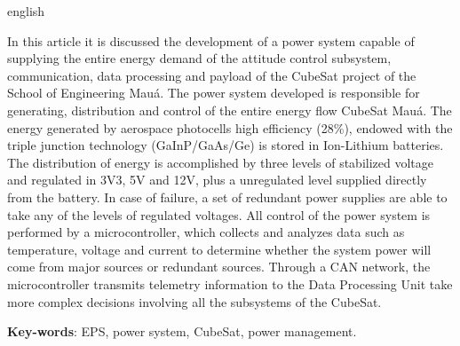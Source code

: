 \documentclass[
	12pt,				%
	openright,			%
	oneside,			%
	a4paper,			%
	english,			%
	french,				%
	spanish,			%
	brazil,				%
	oldfontcommands
	]{abntex2}
\begin{document}
\begin{resumo}[Abstract]
 \begin{otherlanguage*}{english}
 
	In this article it is discussed the development of a power system capable of supplying the entire energy demand of the attitude control subsystem, communication, data processing and payload of the CubeSat project of the School of Engineering Mauá. The power system developed is responsible for generating, distribution and control of the entire energy flow CubeSat Mauá. The energy generated by aerospace photocells high efficiency (28\%), endowed with the triple junction technology (GaInP/GaAs/Ge) is stored in Ion-Lithium batteries. The distribution of energy is accomplished by three levels of stabilized voltage and regulated in 3V3, 5V and 12V, plus a unregulated level supplied directly from the battery. In case of failure, a set of redundant power supplies are able to take any of the levels of regulated voltages. All control of the power system is performed by a microcontroller, which collects and analyzes data such as temperature, voltage and current to determine whether the system power will come from major sources or redundant sources. Through a CAN network, the microcontroller transmits telemetry information to the Data Processing Unit take more complex decisions involving all the subsystems of the CubeSat.

   \vspace{\onelineskip}
 
   \noindent 
   \textbf{Key-words}: EPS, power system, CubeSat, power management.
 \end{otherlanguage*}
\end{resumo}

\listoffigures*
\cleardoublepage

\listoftables*
\cleardoublepage
\end{document}
